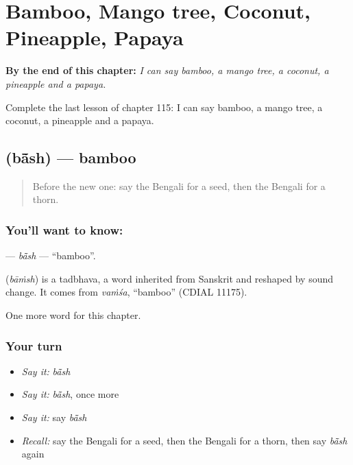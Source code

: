 
\chapter{Bamboo, Mango tree, Coconut, Pineapple, Papaya}
\label{ch:bn-bamboo-mango-tree-coconut-pineapple-papaya}

\begin{chapteropening}
\textbf{By the end of this chapter:} \emph{I can say bamboo, a mango tree, a coconut, a pineapple and a papaya.}

Complete the last lesson of chapter 115: I can say bamboo, a mango tree, a coconut, a pineapple and a papaya.
\end{chapteropening}

\section[\texorpdfstring{\bn{বাঁশ} (bā̃sh)}{বাঁশ (bā̃sh)}]{ (bā̃sh) — bamboo}

\label{lesson:BN-C115-bash}



\begin{quote}
Before the new one: say the Bengali for a seed, then the Bengali for a thorn.
\end{quote}

\subsection*{You'll want to know: }
\textbf{} — \emph{bā̃sh} — \textquotedblleft{}bamboo\textquotedblright{}.

\begin{cousinweb}
\textbf{} (\emph{bāṁsh}) is a tadbhava, a word inherited from Sanskrit and reshaped by sound change. It comes from \emph{vaṁśa}, \textquotedblleft{}bamboo\textquotedblright{} (CDIAL 11175).
\end{cousinweb}

\begin{grammarlens}[title={What you've built}]
One more word for this chapter.
\end{grammarlens}

\subsection*{Your turn}
\begin{itemize}
\raggedright
  \item \emph{Say it:} \emph{bā̃sh}
  \item \emph{Say it:} \emph{bā̃sh}, once more
  \item \emph{Say it:} say \emph{bā̃sh}
  \item \emph{Recall:} say the Bengali for a seed, then the Bengali for a thorn, then say \emph{bā̃sh} again
\end{itemize}

